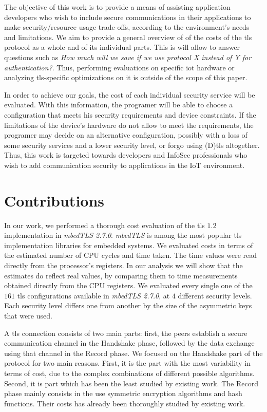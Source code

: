 The objective of this work is to provide a means of assisting application developers
who wish to include secure communications in their applications to make
security/resource usage trade-offs, according to the environment's needs
and limitations. We aim to provide a general overview of of the costs of the \gls{tls} protocol as a whole and
of its individual parts. This is will allow to answer questions such as \textit{How much will we save if we use protocol X instead of Y for authentication?}.
Thus, performing evaluations on specific \gls{iot} hardware or analyzing \gls{tls}-specific optimizations
on it is outside of the scope of this paper.

In order to achieve our goals, the cost of each individual security service
will be evaluated. With this information, the programer will be able to choose a configuration that
meets his security requirements and device constraints. If the limitations of the device's hardware
do not allow to meet the requirements, the programer may decide on an alternative configuration, possibly with
a loss of some security services and a lower security level, or forgo using (D)\gls{tls} altogether.
Thus, this work is targeted towards developers and InfoSec professionals who wish to add communication security
to applications in the IoT environment.

\section{Contributions}

In our work, we performed a thorough cost evaluation of the \gls{tls} $1.2$ implementation in \textit{mbedTLS 2.7.0}.
\textit{mbedTLS} is among the most popular \gls{tls} implementation libraries for embedded systems. We evaluated costs 
in terms of the estimated number of CPU cycles and time taken. The time values were read directly from
the processor's registers. In our analysis we will show that the estimates do reflect real values, by comparing them to time
measurements obtained directly from the CPU registers. We evaluated every single one of the $161$ \gls{tls} configurations available 
in \textit{mbedTLS 2.7.0}, at $4$ different security levels. Each security level differs one from another by the size of the asymmetric keys
that were used.

A \gls{tls} connection consists of two main parts: first, the peers establish a secure communication channel in the Handshake phase,
followed by the data exchange using that channel in the Record phase. We focused on the Handshake part of the protocol for two main reasons.
First, it is the part with the most variability in terms of cost, due to the complex combinations of different possible algorithms.
Second, it is part which has been the least studied by existing work. The Record phase mainly consists in the use symmetric encryption algorithms and hash functions. Their costs has already been thoroughly studied by existing work.

